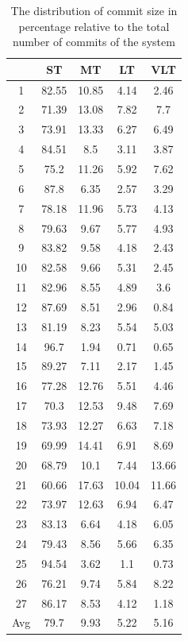 \documentclass[a4paper,twoside]{article}
\begin{document}
\begin{table}[!h]
\renewcommand{\arraystretch}{1.25}
\caption{The distribution of commit size in percentage relative to the total number of commits of the system }
\label{table:5}
\centering
\begin{tabular}{|c|c|c|c|c|}
\hline
   &	ST	&	 MT	&	LT	&	VLT	\\
\hline
1	&	82.55	&	10.85	&	4.14	&	2.46	\\
2	&	71.39	&	13.08	&	7.82	&	7.7	\\
3	&	73.91	&	13.33	&	6.27	&	6.49	\\
4	&	84.51	&	8.5	&	3.11	&	3.87	\\
5	&	75.2	&	11.26	&	5.92	&	7.62	\\
6	&	87.8	&	6.35	&	2.57	&	3.29	\\
7	&	78.18	&	11.96	&	5.73	&	4.13	\\
8	&	79.63	&	9.67	&	5.77	&	4.93	\\
9	&	83.82	&	9.58	&	4.18	&	2.43	\\
10	&	82.58	&	9.66	&	5.31	&	2.45	\\
11	&	82.96	&	8.55	&	4.89	&	3.6	\\
12	&	87.69	&	8.51	&	2.96	&	0.84	\\
13	&	81.19	&	8.23	&	5.54	&	5.03	\\
14	&	96.7	&	1.94	&	0.71	&	0.65	\\
15	&	89.27	&	7.11	&	2.17	&	1.45	\\
16	&	77.28	&	12.76	&	5.51	&	4.46	\\
17	&	70.3	&	12.53	&	9.48	&	7.69	\\
18	&	73.93	&	12.27	&	6.63	&	7.18	\\
19	&	69.99	&	14.41	&	6.91	&	8.69	\\
20	&	68.79	&	10.1	&	7.44	&	13.66	\\
21	&	60.66	&	17.63	&	10.04	&	11.66	\\
22	&	73.97	&	12.63	&	6.94	&	6.47	\\
23	&	83.13	&	6.64	&	4.18	&	6.05	\\
24	&	79.43	&	8.56	&	5.66	&	6.35	\\
25	&	94.54	&	3.62	&	1.1	&	0.73	\\
26	&	76.21	&	9.74	&	5.84	&	8.22	\\
27	&	86.17	&	8.53	&	4.12	&	1.18	\\
\hline
Avg	&	79.7	&	9.93	&	5.22	&	5.16	\\
\hline
\end{tabular}
\end{table}
\end{document}
